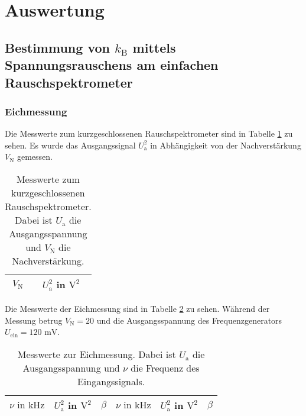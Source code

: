 

\section{Auswertung}

\subsection{Bestimmung von $k_\text{B}$ mittels Spannungsrauschens am
			einfachen Rauschspektrometer}


	\subsubsection{Eichmessung}

		Die Messwerte zum kurzgeschlossenen Rauschspektrometer sind
		in Tabelle \ref{tab:eichung_eigenrauschen_einfach} zu sehen.
		Es wurde das Ausgangssignal $U^2_\text{a}$ in Abhängigkeit von
		der Nachverstärkung $V_\text{N}$ gemessen.

		\begin{table}[h]
		\centering
			\begin{tabular}{cc}
				\toprule \midrule
				$V_\text{N}$ & $U^2_\text{a}$ in $\text{V}^2$
				\\
				\midrule
				
				\midrule \bottomrule
			\end{tabular}
			\caption{Messwerte zum kurzgeschlossenen
			Rauschspektrometer. Dabei ist $U_\text{a}$ die
			Ausgangsspannung und $V_\text{N}$ die Nachverstärkung.}
			\label{tab:eichung_eigenrauschen_einfach}
		\end{table}

		Die Messwerte der Eichmessung sind in Tabelle
		\ref{tab:eichung_einfach} zu sehen. Während der Messung
		betrug $V_\text{N}=20$ und die Ausgangsspannung des
		Frequenzgenerators $U_\text{ein} = 120 \text{ mV}$.

		\begin{table}[h]
		\centering
			\begin{tabular}{ccc|ccc}
				\toprule \midrule
				$\nu \text{ in} \text{ kHz}$ & $U^2_\text{a}$ in $\text{V}^2$ & $\beta$ &
				$\nu \text{ in} \text{ kHz}$ & $U^2_\text{a}$ in $\text{V}^2$ & $\beta$ \\
				\midrule
				
				\midrule \bottomrule
			\end{tabular}
			\caption{Messwerte zur Eichmessung. Dabei ist $U_\text{a}$
			die
			Ausgangsspannung und $\nu$ die Frequenz des
			Eingangssignals. }
			\label{tab:eichung_einfach}
		\end{table}

